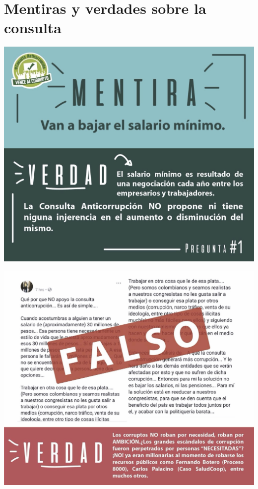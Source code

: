 \documentclass[twoside]{article}
\begin{document}
\section*{Mentiras y verdades sobre la consulta}

\begin{minipage}{0.45\linewidth}
\includegraphics[scale=.175]{Images/mentira_consulta_anticorrupcion_salario_minimo.jpeg}
\end{minipage}\hfill
\begin{minipage}{0.45\linewidth}
  \includegraphics[scale=.175]{Images/mentira_consulta_anticorrupcion_salario_congresistas_estilo_vida.jpeg}
\end{minipage}
\end{document}
